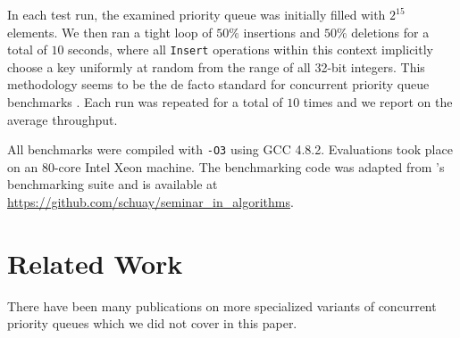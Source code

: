 \documentclass[a4paper,10pt]{article}
\begin{document}
In each test run, the examined priority queue was initially filled with $2^{15}$
elements. We then ran a tight loop of $50\%$ insertions and $50\%$ deletions
for a total of $10$ seconds, where all \lstinline|Insert|
operations within this context implicitly choose a key uniformly at random from
the range of all 32-bit integers. This methodology seems to be the de facto standard for concurrent %
priority queue benchmarks
\cite{alistarhspraylist,linden2013skiplist,shavit2000skiplist,sundell2003fast}.
Each run was repeated for a total of $10$ times
and we report on the average throughput.

All benchmarks were compiled with \verb|-O3| using GCC 4.8.2. Evaluations took place
on an 80-core Intel Xeon machine. The benchmarking code was adapted from \citeauthor{linden2013skiplist}'s
benchmarking suite and is available at \url{https://github.com/schuay/seminar_in_algorithms}.


\begin{comment}
Sections / rough structure:
* Basic concepts and definitions. Linearizability, sequ./quiescent consistency,
  lock-free, wait-free, disjoint-access parallelism (one of the papers has good
  summaries of these).
  Maybe atomic primitives such as CAS (but probably not).
* Priority queue definitions, semantics, usages. Mention inherent
  non-scalability through DeleteMin().
* Skiplist, heap definitions, semantics, usages.
* Follow development of current state of the art from Hunt Heap ~> Shavit ~>
  Tsigas ~> Linden.
* Maybe benchmarks on mars.

Additional notes:
* Sketch development: Heap, Fraser Skiplist (Details, mention why linearizable),
  Sundell/Tsigas, other Skiplist-based PQs
* Modern developments: SprayList, Wimmer et al. Relation to other relaxed structures such as k-FIFO.
\end{comment}

\section{Related Work}

There have been many publications on more specialized variants of concurrent priority queues
which we did not cover in this paper.
\end{document}
